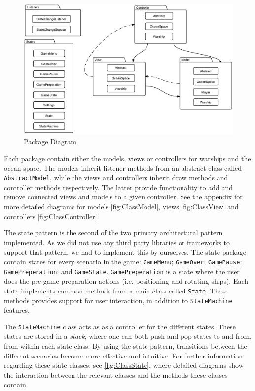 \begin{figure}[ht]
    \includegraphics[width=\textwidth]{img/PackageDiagram.png}
    \caption{Package Diagram}
    \label{fig:PackageDiagram}
\end{figure}

Each package contain either the models, views or controllers for warships and the ocean space. The models inherit listener methods from an abstract class called \texttt{AbstractModel}, while the views and controllers inherit draw methods and controller methods respectively. The latter provide functionality to add and remove connected views and models to a given controller. See the appendix for more detailed diagrams for models \ref{fig:ClassModel}, views \ref{fig:ClassView} and controllers \ref{fig:ClassController}.





The state pattern is the second of the two primary architectural pattern implemented. As we did not use any third party libraries or frameworks to support that pattern, we had to implement this by ourselves. %
The state package contain states for every scenario in the game: \texttt{GameMenu}; \texttt{GameOver}; \texttt{GamePause}; \texttt{GamePreperation}; and \texttt{GameState}. \texttt{GamePreperation} is a state where the user does the pre-game preparation actions (i.e. positioning and rotating ships). Each state implements common methods from a main class called \texttt{State}. These methods provides support for user interaction, in addition to \texttt{StateMachine} features. %

The \texttt{StateMachine} class acts as as a controller for the different states. These states are stored in a \emph{stack}, where one can both push and pop states to and from, from within each state class. By using the state pattern, transitions between the different scenarios become more effective and intuitive. For further information regarding these state classes, see \ref{fig:ClassState}, where detailed diagrams show the interaction between the relevant classes and the methods these classes contain.

